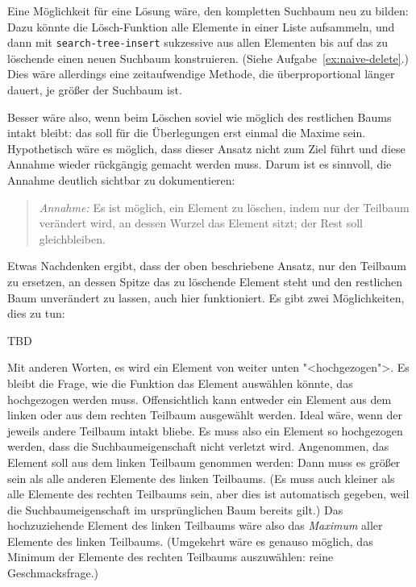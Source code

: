 Eine Möglichkeit für eine Lösung wäre, den kompletten Suchbaum neu zu
bilden: Dazu könnte die Lösch-Funktion alle Elemente in einer Liste
aufsammeln, und dann mit \texttt{search-tree-insert} sukzessive aus
allen Elementen bis auf das zu löschende einen neuen Suchbaum
konstruieren.  (Siehe Aufgabe~\ref{ex:naive-delete}.)  Dies wäre
allerdings eine zeitaufwendige Methode, die überproportional länger
dauert, je größer der Suchbaum ist.

Besser wäre also, wenn beim Löschen soviel wie möglich des restlichen
Baums intakt bleibt: das soll für die Überlegungen erst einmal die
Maxime sein.  Hypothetisch wäre es möglich, dass dieser Ansatz nicht
zum Ziel führt und diese Annahme wieder rückgängig gemacht werden
muss.  Darum ist es sinnvoll, die Annahme deutlich sichtbar
zu dokumentieren:

\begin{quote}
  \textit{Annahme:} Es ist möglich, ein Element zu löschen, indem nur
  der Teilbaum verändert wird, an dessen Wurzel das Element sitzt; der
  Rest soll gleichbleiben.
\end{quote}

Etwas Nachdenken ergibt, dass der oben beschriebene
Ansatz, nur den Teilbaum zu ersetzen, an dessen Spitze das zu
löschende Element steht und den restlichen Baum unverändert zu lassen,
auch hier funktioniert.  Es gibt zwei Möglichkeiten, dies zu tun:
%

TBD

% 
Mit anderen Worten, es wird ein Element von weiter unten
"<hochgezogen">.  Es bleibt die Frage, wie die Funktion das Element
auswählen könnte, das hochgezogen werden muss.  Offensichtlich kann
entweder ein Element aus dem linken oder aus dem rechten Teilbaum
ausgewählt werden.  Ideal wäre, wenn der jeweils andere Teilbaum
intakt bliebe.  Es muss also ein Element so hochgezogen werden, dass die
Suchbaumeigenschaft nicht verletzt wird.  Angenommen, das Element soll
aus dem linken Teilbaum genommen werden: Dann muss es größer sein als
alle anderen Elemente des linken Teilbaums.  (Es muss auch kleiner als
alle Elemente des rechten Teilbaums sein, aber dies ist automatisch
gegeben, weil die Suchbaumeigenschaft im ursprünglichen Baum bereits
gilt.)  Das hochzuziehende Element des linken Teilbaums wäre  also das
\emph{Maximum} aller Elemente des linken Teilbaums.  (Umgekehrt wäre
es genauso möglich, das Minimum der Elemente des rechten Teilbaums
auszuwählen: reine Geschmacksfrage.)

